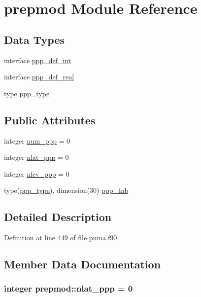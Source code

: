\hypertarget{classprepmod}{
\section{prepmod \-Module \-Reference}
\label{classprepmod}
}
\subsection*{\-Data \-Types}
\begin{DoxyCompactItemize}
\item 
interface \hyperlink{interfaceprepmod_1_1ppp__def__int}{ppp\-\_\-def\-\_\-int}
\item 
interface \hyperlink{interfaceprepmod_1_1ppp__def__real}{ppp\-\_\-def\-\_\-real}
\item 
type \hyperlink{structprepmod_1_1ppp__type}{ppp\-\_\-type}
\end{DoxyCompactItemize}
\subsection*{\-Public \-Attributes}
\begin{DoxyCompactItemize}
\item 
integer \hyperlink{classprepmod_af7c26e3eb6ac74ce7f869f994f3f9096}{num\-\_\-ppp} = 0
\item 
integer \hyperlink{classprepmod_ab9f52241ed0e8b24728713f99adbef26}{nlat\-\_\-ppp} = 0
\item 
integer \hyperlink{classprepmod_ab4424b6e9966133154f2c7521b4f20c7}{nlev\-\_\-ppp} = 0
\item 
type(\hyperlink{structprepmod_1_1ppp__type}{ppp\-\_\-type}), dimension(30) \hyperlink{classprepmod_afa7847e6f1a2a1e05e5318e9ec47ad51}{ppp\-\_\-tab}
\end{DoxyCompactItemize}


\subsection{\-Detailed \-Description}


\-Definition at line 449 of file puma.\-f90.



\subsection{\-Member \-Data \-Documentation}
\hypertarget{classprepmod_ab9f52241ed0e8b24728713f99adbef26}{
\subsubsection[{nlat\-\_\-ppp}]{\setlength{\rightskip}{0pt plus 5cm}integer {\bf prepmod\-::nlat\-\_\-ppp} = 0}}
\label{classprepmod_ab9f52241ed0e8b24728713f99adbef26}


